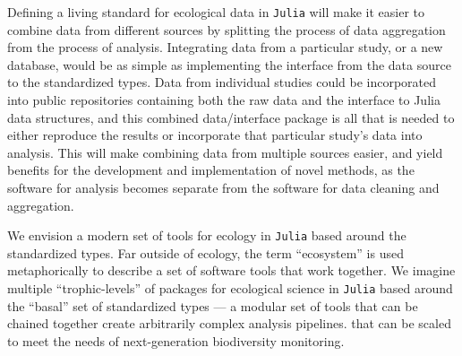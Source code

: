 \documentclass[11pt]{article}
\begin{document}
Defining a living standard for ecological data in \texttt{Julia} will
make it easier to combine data from different sources by splitting the
process of data aggregation from the process of analysis. Integrating
data from a particular study, or a new database, would be as simple as
implementing the interface from the data source to the standardized
types. Data from individual studies could be incorporated into public
repositories containing both the raw data and the interface to Julia
data structures, and this combined data/interface package is all that is
needed to either reproduce the results or incorporate that particular
study's data into analysis. This will make combining data from multiple
sources easier, and yield benefits for the development and
implementation of novel methods, as the software for analysis becomes
separate from the software for data cleaning and aggregation.

We envision a modern set of tools for ecology in \texttt{Julia} based
around the standardized types. Far outside of ecology, the term
``ecosystem'' is used metaphorically to describe a set of software tools
that work together. We imagine multiple ``trophic-levels'' of packages
for ecological science in \texttt{Julia} based around the ``basal'' set
of standardized types --- a modular set of tools that can be chained
together create arbitrarily complex analysis pipelines. that can be
scaled to meet the needs of next-generation biodiversity monitoring.
\end{document}

